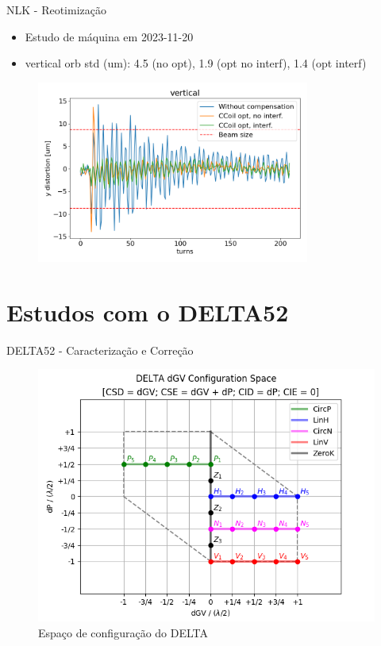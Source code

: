 \documentclass{beamer}					  %
\begin{document}
\begin{frame}{NLK - Reotimização}
    \scriptsize{\begin{itemize}
    		\item Estudo de máquina em 2023-11-20
            \item vertical orb std (um): 4.5 (no opt), 1.9 (opt no interf),  1.4 (opt interf)
    \end{itemize}}
    \begin{figure}[H]
        	\centering
            \includegraphics[width=0.8\textwidth]{2023-12-12/figures/vertical_nlk_distortion_interference.png}
            \label{fig:bba}
    \end{figure} 
\end{frame}

\section{Estudos com o DELTA52}

\begin{frame}{DELTA52 - Caracterização e Correção}
    \begin{figure}[H]
    		\centering
            \includegraphics[width=.8\textwidth]{2023-12-12/figures/id-delta-dgv-config-space.png}
            \caption{Espaço de configuração do DELTA}
            \label{fig:delta-config-space}
    \end{figure}
\end{frame}
\end{document}
